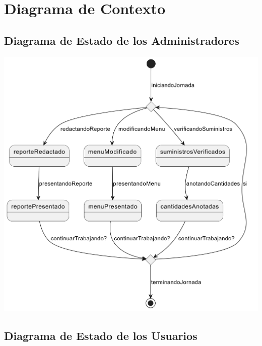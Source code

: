 \documentclass[12pt]{article}
\begin{document}
\pagebreak

\section{Diagrama de Contexto}

\subsection{Diagrama de Estado de los Administradores}

\vspace{1cm}

\begin{center}
	\includegraphics[width=15cm]{Domain Modeling [01] - Status Diagram: Administrators.png}
\end{center}

\subsection{Diagrama de Estado de los Usuarios}

\vspace{1cm}
\end{document}
